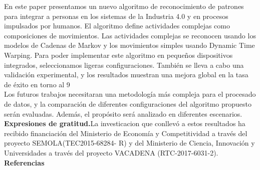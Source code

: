\documentclass{article}
\begin{document}
En este paper presentamos un nuevo algoritmo de reconocimiento de patrones para integrar a personas en los sistemas de la  Industria 4.0 y en procesos impulsados por humanos. El algoritmo define actividades complejas como composiciones de movimientos. Las actividades complejas se reconocen usando los modelos de Cadenas de Markov y los movimientos simples usando Dynamic Time Warping. Para poder implementar este algoritmo en pequeños dispositivos integrados, seleccionamos ligeras configuraciones. También se lleva a cabo una validación experimental, y los resultados muestran una mejora global en la tasa de éxito en torno al 9%
\\
Los futuros trabajos necesitaran una metodología más compleja para el procesado de datos, y la comparación de diferentes configuraciones del algoritmo propuesto serán evaluadas. Además, el propósito será analizado en diferentes escenarios.
\\
\textbf{Expresiones de gratitud.}La investicacion que conllevó a estos resultados ha recibido financiación del Ministerio de Economía y Competitividad a través del proyecto SEMOLA(TEC2015-68284- R) y del Ministerio de Ciencia, Innovación y Universidades a través del proyecto VACADENA (RTC-2017-6031-2).
\\
\textbf{Referencias} 
\end{document}
